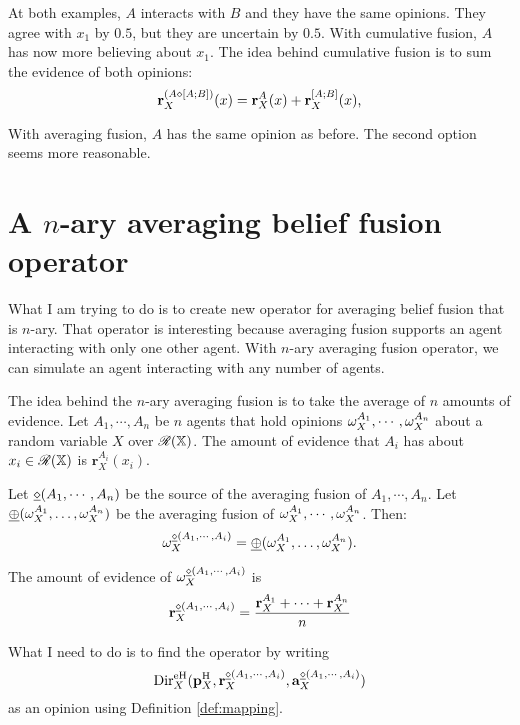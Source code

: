 \documentclass[a4paper,12pt]{article}
\theoremstyle{definition}
\theoremstyle{theorem}
\numberwithin{equation}{section}
\begin{document}
At both examples, $A$ interacts with $B$ and they have the same opinions. They agree with $x_1$ by $0.5$, but they are uncertain by $0.5$. With cumulative fusion, $A$ has now more believing about $x_1$. The idea behind cumulative fusion is to sum the evidence of both opinions:
\begin{equation}
\mathbf{r}^{(A \diamond [A; B])}_X(x) = \mathbf{r}^A_X(x) + \mathbf{r}^{[A; B]}_X(x) \text{,}
\end{equation}

With averaging fusion, $A$ has the same opinion as before. The second option seems more reasonable.


\section{A $n$-ary averaging belief fusion operator}

What I am trying to do is to create new operator for averaging belief fusion that is $n$-ary. That operator is interesting because averaging fusion supports an agent interacting with only one other agent. With $n$-ary averaging fusion operator, we can simulate an agent interacting with any number of agents.

The idea behind the $n$-ary averaging fusion is to take the average of $n$ amounts of evidence. Let $A_1, \cdots, A_n$ be $n$ agents that hold opinions $\omega^{A_1}_{X}, \cdots, \omega^{A_n}_{X}$ about a random variable $X$ over $\mathcal{R}(\mathbb{X})$. The amount of evidence that $A_i$ has about $x_i \in \mathcal{R}(\mathbb{X})$ is $\mathbf{r}^{A_i}_X(x_i)$.

Let $\underline{\diamond}(A_1, \cdots, A_n)$ be the source of the averaging fusion of $A_1, \cdots, A_n$. Let $\underline{\oplus}(\omega^{A_1}_{X}, \dots, \omega^{A_n}_{X})$ be the averaging fusion of $\omega^{A_1}_{X}, \cdots, \omega^{A_n}_{X}$. Then:
\begin{equation}
\omega^{\underline{\diamond}(A_1, \cdots, A_i)}_{X} = \underline{\oplus}(\omega^{A_1}_{X}, \dots, \omega^{A_n}_{X}) \text{.}
\end{equation}

The amount of evidence of $\omega^{\underline{\diamond}(A_1, \cdots, A_i)}_{X}$ is
\begin{equation}
\mathbf{r}^{\underline{\diamond}(A_1, \cdots, A_i)}_X = \dfrac{\mathbf{r}^{A_1}_X + \cdots + \mathbf{r}^{A_n}_X}{n} 
\end{equation}

What I need to do is to find the operator by writing
\begin{equation}
\mathrm{Dir}^{\mathrm{eH}}_X(\mathbf{p}^{\mathrm{H}}_X, \mathbf{r}^{\underline{\diamond}(A_1, \cdots, A_i)}_X, \mathbf{a}^{\underline{\diamond}(A_1, \cdots, A_i)}_{X})
\end{equation}
as an opinion using Definition \ref{def:mapping}.
\end{document}
